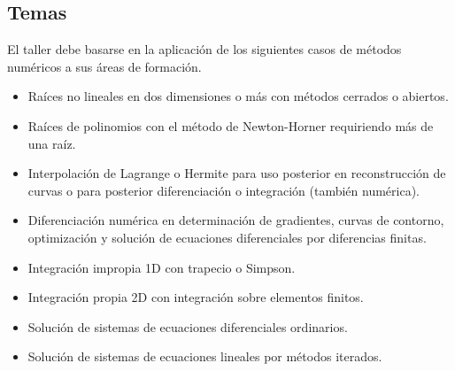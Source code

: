 \documentclass[12pt]{article}
\begin{document}
\subsection{Temas}

El taller debe basarse en la aplicación de los siguientes casos de métodos numéricos a sus áreas de formación.

\begin{itemize}
\item Raíces no lineales en dos dimensiones o más con métodos cerrados o abiertos.
\item Raíces de polinomios con el método de Newton-Horner requiriendo más de una raíz.
\item Interpolación de Lagrange o Hermite para uso posterior en reconstrucción de curvas o para posterior diferenciación o integración (también numérica).
\item Diferenciación numérica en determinación de gradientes, curvas de contorno, optimización y solución de ecuaciones diferenciales por diferencias finitas.
\item Integración impropia 1D con trapecio o Simpson.
\item Integración propia 2D con integración sobre elementos finitos.
\item Solución de sistemas de ecuaciones diferenciales ordinarios.
\item Solución de sistemas de ecuaciones lineales por métodos iterados.
\end{itemize}
\end{document}
